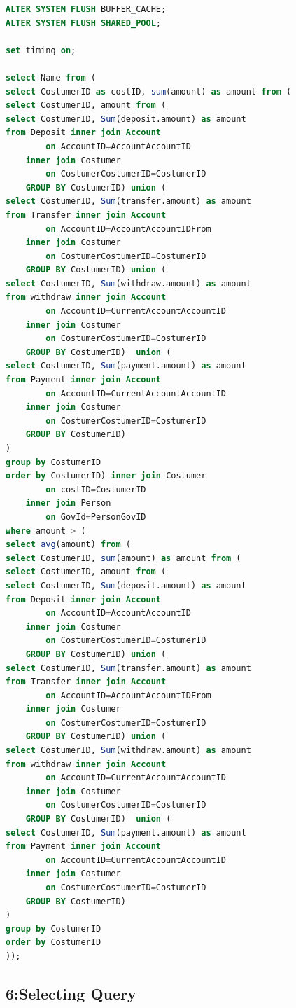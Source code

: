\documentclass[a4paper, 10pt]{article}
\begin{document}
\begin{lstlisting}[language=SQL]
ALTER SYSTEM FLUSH BUFFER_CACHE;
ALTER SYSTEM FLUSH SHARED_POOL;

set timing on;

select Name from (
select CostumerID as costID, sum(amount) as amount from (
select CostumerID, amount from (
select CostumerID, Sum(deposit.amount) as amount
from Deposit inner join Account 
        on AccountID=AccountAccountID 
    inner join Costumer 
        on CostumerCostumerID=CostumerID
    GROUP BY CostumerID) union (
select CostumerID, Sum(transfer.amount) as amount
from Transfer inner join Account 
        on AccountID=AccountAccountIDFrom 
    inner join Costumer 
        on CostumerCostumerID=CostumerID
    GROUP BY CostumerID) union (
select CostumerID, Sum(withdraw.amount) as amount
from withdraw inner join Account 
        on AccountID=CurrentAccountAccountID 
    inner join Costumer 
        on CostumerCostumerID=CostumerID
    GROUP BY CostumerID)  union (   
select CostumerID, Sum(payment.amount) as amount
from Payment inner join Account 
        on AccountID=CurrentAccountAccountID 
    inner join Costumer 
        on CostumerCostumerID=CostumerID
    GROUP BY CostumerID)
)
group by CostumerID
order by CostumerID) inner join Costumer 
        on costID=CostumerID 
    inner join Person 
        on GovId=PersonGovID
where amount > (
select avg(amount) from (
select CostumerID, sum(amount) as amount from (
select CostumerID, amount from (
select CostumerID, Sum(deposit.amount) as amount
from Deposit inner join Account 
        on AccountID=AccountAccountID 
    inner join Costumer 
        on CostumerCostumerID=CostumerID
    GROUP BY CostumerID) union (
select CostumerID, Sum(transfer.amount) as amount
from Transfer inner join Account 
        on AccountID=AccountAccountIDFrom 
    inner join Costumer 
        on CostumerCostumerID=CostumerID
    GROUP BY CostumerID) union (
select CostumerID, Sum(withdraw.amount) as amount
from withdraw inner join Account 
        on AccountID=CurrentAccountAccountID 
    inner join Costumer 
        on CostumerCostumerID=CostumerID
    GROUP BY CostumerID)  union (   
select CostumerID, Sum(payment.amount) as amount
from Payment inner join Account 
        on AccountID=CurrentAccountAccountID 
    inner join Costumer 
        on CostumerCostumerID=CostumerID
    GROUP BY CostumerID)
)
group by CostumerID
order by CostumerID
));
\end{lstlisting}

\subsection{6:Selecting Query}
\end{document}

